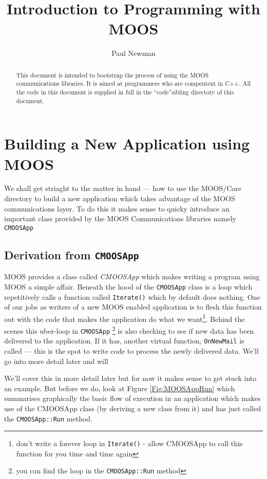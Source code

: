 \documentclass[a4paper,10pt]{article}
\title{Introduction to Programming with MOOS}
\author{Paul Newman}
\newcommand{\Code}[1]{\texttt{#1} }
\newcommand{\code}[1]{\Code{#1} }
\begin{document}
\maketitle


\begin{center}
\end{center}

\begin{abstract}
This document is intended to bootstrap the process of using the
MOOS communications libraries. It is aimed at programmers who are
compentent in C++. All the code in this document is supplied
in full in the ``code''sibling directory of this document.
\end{abstract}



\section{Building a New Application using MOOS}

We shall get striaght to the matter in hand --- how to use the
MOOS/Core directory to build a new application which takes
advantage of the MOOS communications layer. To do this it makes
sense to quicky introduce an important class provided by the MOOS
Communications libraries namely \code{CMOOSApp}


\subsection{Derivation from \code{CMOOSApp}}
MOOS provides a class called \textit{CMOOSApp} which makes writing
a program using MOOS a simple affair. Beneath the hood of the
\code{CMOOSApp} class is a loop which repetitively calls a
function called \code{Iterate()} which by default does nothing.
One of our jobs as writers of a new MOOS enabled application is to
flesh this function out with the code that makes the application
do what we want\footnote{don't write a forever loop in
\code{Iterate()} - allow CMOOSApp to call this function for you
time and time again}. Behind the scenes this uber-loop in
\code{CMOOSApp}\footnote{you can find the loop in the
\code{CMOOSApp::Run} method} is also checking to see if new data
has been delivered to the application. If it has, another virtual
function, \code{OnNewMail} is called --- this is the spot to write
code to process the newly delivered data. We'll go into more
detail later and will


We'll cover this in more detail later but for now it makes sense
to get stuck into an example. But before we do, look at Figure
\ref{Fig:MOOSAppRun} which summarises graphically the basic flow
of execution in an application which makes use of the CMOOSApp
class (by deriving a new class from it) and has just called the
\code{CMOOSApp::Run} method.
\end{document}
